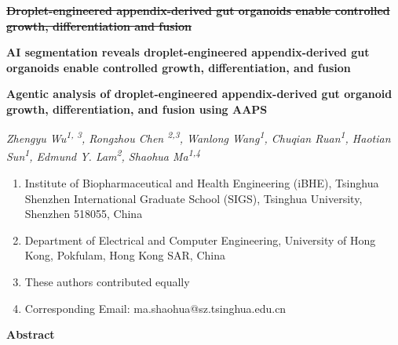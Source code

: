 \documentclass[
]{article}
\author{}
\date{}
\begin{document}
\textbf{\sout{Droplet-engineered appendix-derived gut organoids enable controlled growth, differentiation and fusion}}

\textbf{AI segmentation reveals droplet-engineered appendix-derived gut organoids enable controlled growth, differentiation, and fusion}

\textbf{Agentic analysis of droplet-engineered appendix-derived gut organoid growth, differentiation, and fusion using AAPS}

\emph{Zhengyu Wu\textsuperscript{1, 3}, Rongzhou Chen \textsuperscript{2,3}, Wanlong Wang\textsuperscript{1}, Chuqian Ruan\textsuperscript{1}, Haotian Sun\textsuperscript{1}, Edmund Y. Lam\textsuperscript{2}, Shaohua Ma\textsuperscript{1,4}}

\begin{enumerate}
\def\labelenumi{\arabic{enumi}.}
\item
  Institute of Biopharmaceutical and Health Engineering (iBHE), Tsinghua Shenzhen International Graduate School (SIGS), Tsinghua University, Shenzhen 518055, China
\item
  Department of Electrical and Computer Engineering, University of Hong Kong, Pokfulam, Hong Kong SAR, China
\item
  These authors contributed equally
\item
  Corresponding Email: ma.shaohua@sz.tsinghua.edu.cn
\end{enumerate}

\textbf{Abstract}
\end{document}
